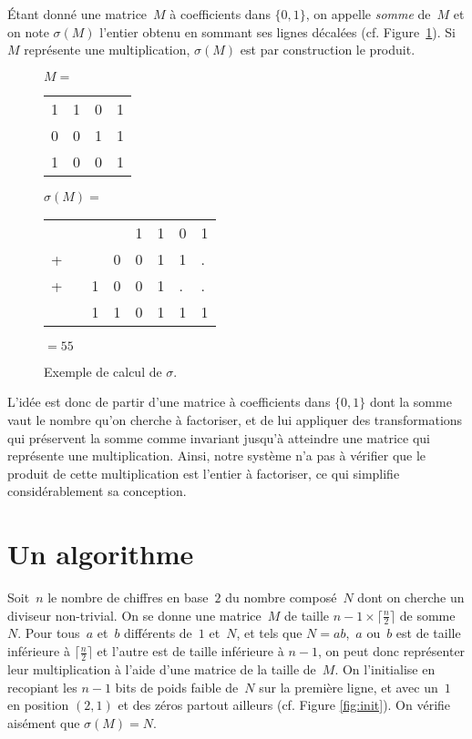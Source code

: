 \begin{df*}
Étant donné une matrice~$M$ à coefficients dans $\{0,1\}$, on appelle \emph{somme} de~$M$ et on note $\sigma (M)$ l'entier obtenu en sommant ses lignes décalées (cf. Figure~\ref{fig:ExSigma}). Si~$M$ représente une multiplication, $\sigma(M)$ est par construction le produit. 
\end{df*}


\begin{figure}[]
\centering
\begin{minipage}[]{0.3\linewidth}
$M=$
\begin{tabular}{cccc}
1&1&0&1\\
0&0&1&1\\
1&0&0&1\\
\end{tabular}
\end{minipage}
\quad
\begin{minipage}[]{0.45\linewidth}
$\sigma(M)=$
\begin{tabular}{llllllll}
&&&&1&1&0&1\\
+&&&0&0&1&1&.\\
+&&1&0&0&1&.&.\\
\hline
&&1&1&0&1&1&1\\
\end{tabular}
$=55$
\end{minipage}
\caption{Exemple de calcul de $\sigma$.}
\label{fig:ExSigma}
\end{figure}

L'idée est donc de partir d'une matrice à coefficients dans $\{0,1\}$ dont la somme vaut le nombre qu'on cherche à factoriser, et de lui appliquer des transformations qui préservent la somme comme invariant jusqu'à atteindre une matrice qui représente une multiplication. Ainsi, notre système n'a pas à vérifier que le produit de cette multiplication est l'entier à factoriser, ce qui simplifie considérablement sa conception.

\section{Un algorithme}

Soit~$n$ le nombre de chiffres en base~$2$ du nombre composé~$N$ dont on cherche un diviseur non-trivial. On se donne une matrice~$M$ de taille $ n-1 \times \lceil \frac{n}{2}\rceil$ de somme~$N$. Pour tous~$a$ et~$b$ différents de~$1$ et~$N$, et tels que $N = ab$,~$a$ ou~$b$ est de taille inférieure à $\lceil\frac{n}{2}\rceil$ et l'autre est de taille inférieure à $n-1$, on peut donc représenter leur multiplication à l'aide d'une matrice de la taille de~$M$. On l'initialise en recopiant les $n-1$ bits de poids faible de~$N$ sur la première ligne, et avec un~$1$ en position $(2,1)$ et des zéros partout ailleurs (cf. Figure \ref{fig:init}). On vérifie aisément que $\sigma(M)=N$. 


